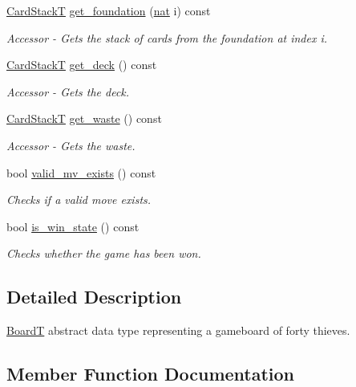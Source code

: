 \begin{DoxyCompactItemize}
\hyperlink{_card_stack_8h_a29a6854caf5fec306ee8fc0c6b453837}{Card\+StackT} \hyperlink{class_board_t_a176d67159552186af58350524a018778}{get\+\_\+foundation} (\hyperlink{_card_types_8h_a56638ee9d162e8cce3a15f92d2023d6e}{nat} i) const
\begin{DoxyCompactList}\small\item\em Accessor -\/ Gets the stack of cards from the foundation at index i. \end{DoxyCompactList}\item 
\hyperlink{_card_stack_8h_a29a6854caf5fec306ee8fc0c6b453837}{Card\+StackT} \hyperlink{class_board_t_ada6b516a48162894508e3a90d210999c}{get\+\_\+deck} () const
\begin{DoxyCompactList}\small\item\em Accessor -\/ Gets the deck. \end{DoxyCompactList}\item 
\hyperlink{_card_stack_8h_a29a6854caf5fec306ee8fc0c6b453837}{Card\+StackT} \hyperlink{class_board_t_a36885ac5b8a2a6adfda866a3f9e8fe3a}{get\+\_\+waste} () const
\begin{DoxyCompactList}\small\item\em Accessor -\/ Gets the waste. \end{DoxyCompactList}\item 
bool \hyperlink{class_board_t_a7fa4dd1c15a998f3efab189bd0682fc7}{valid\+\_\+mv\+\_\+exists} () const
\begin{DoxyCompactList}\small\item\em Checks if a valid move exists. \end{DoxyCompactList}\item 
bool \hyperlink{class_board_t_acd9b901204dafd4c4c1950530781ab12}{is\+\_\+win\+\_\+state} () const
\begin{DoxyCompactList}\small\item\em Checks whether the game has been won. \end{DoxyCompactList}\end{DoxyCompactItemize}


\subsection{Detailed Description}
\hyperlink{class_board_t}{BoardT} abstract data type representing a gameboard of forty thieves. 

\subsection{Member Function Documentation}
\mbox{\label{class_board_t_ada6b516a48162894508e3a90d210999c}} 
